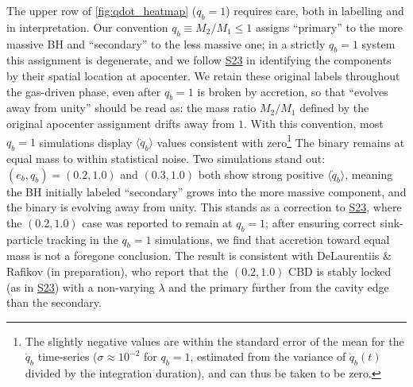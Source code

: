 \documentclass[fleqn,usenatbib]{mnras}
\newcommand{\Stwentythree}{\href{https://doi.org/10.1093/mnras/stac3263}{S23}\xspace}
\begin{document}
The upper row of \autoref{fig:qdot_heatmap} ($q_b = 1$) requires care, both in labelling and in interpretation. Our convention $q_b \equiv M_2/M_1 \leq 1$ assigns ``primary'' to the more massive BH and ``secondary'' to the less massive one; in a strictly $q_b = 1$ system this assignment is degenerate, and we follow \Stwentythree in identifying the components by their spatial location at apocenter. We retain these original labels throughout the gas-driven phase, even after $q_b = 1$ is broken by accretion, so that ``evolves away from unity'' should be read as: the mass ratio $M_2/M_1$ defined by the original apocenter assignment drifts away from $1$. With this convention, most $q_b = 1$ simulations display $\langle \dot{q}_b \rangle$ values consistent with zero\footnote{The slightly negative values are within the standard error of the mean for the $\dot{q}_b$ time-series ($\sigma \approx 10^{-2}$ for $q_b = 1$, estimated from the variance of $\dot{q}_b(t)$ divided by the integration duration), and can thus be taken to be zero.} The binary remains at equal mass to within statistical noise. Two simulations stand out: $(e_b, q_b) = (0.2, 1.0)$ and $(0.3, 1.0)$ both show strong positive $\langle \dot{q}_b \rangle$, meaning the BH initially labeled ``secondary'' grows into the more massive component, and the binary is evolving away from unity. This stands as a correction to \Stwentythree, where the $(0.2, 1.0)$ case was reported to remain at $q_b = 1$; after ensuring correct sink-particle tracking in the $q_b = 1$ simulations, we find that accretion toward equal mass is not a foregone conclusion. The result is consistent with DeLaurentiis \& Rafikov (in preparation), who report that the $(0.2, 1.0)$ CBD is stably locked (as in \Stwentythree) with a non-varying $\lambda$ and the primary further from the cavity edge than the secondary.
\end{document}
